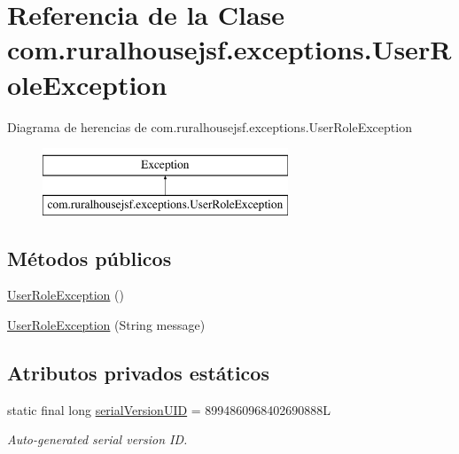 \hypertarget{classcom_1_1ruralhousejsf_1_1exceptions_1_1_user_role_exception}{}\section{Referencia de la Clase com.\+ruralhousejsf.\+exceptions.\+User\+Role\+Exception}
\label{classcom_1_1ruralhousejsf_1_1exceptions_1_1_user_role_exception}
Diagrama de herencias de com.\+ruralhousejsf.\+exceptions.\+User\+Role\+Exception\begin{figure}[H]
\begin{center}
\leavevmode
\includegraphics[height=2.000000cm]{d4/d8f/classcom_1_1ruralhousejsf_1_1exceptions_1_1_user_role_exception}
\end{center}
\end{figure}
\subsection*{Métodos públicos}
\begin{DoxyCompactItemize}
\item 
\mbox{\hyperlink{classcom_1_1ruralhousejsf_1_1exceptions_1_1_user_role_exception_a8ca96b595e439045ef33ddcea0c21da2}{User\+Role\+Exception}} ()
\item 
\mbox{\hyperlink{classcom_1_1ruralhousejsf_1_1exceptions_1_1_user_role_exception_a7c888f23edf10f7c1347519b6d03752d}{User\+Role\+Exception}} (String message)
\end{DoxyCompactItemize}
\subsection*{Atributos privados estáticos}
\begin{DoxyCompactItemize}
\item 
static final long \mbox{\hyperlink{classcom_1_1ruralhousejsf_1_1exceptions_1_1_user_role_exception_a9894bada17e7192af3bfcdd028fd6c57}{serial\+Version\+U\+ID}} = 8994860968402690888L
\begin{DoxyCompactList}\small\item\em Auto-\/generated serial version ID. \end{DoxyCompactList}\end{DoxyCompactItemize}


